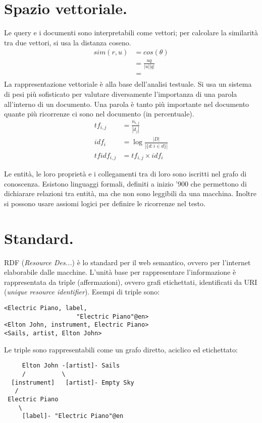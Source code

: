 \documentclass[11pt, twocolumn]{article}
\begin{document}
\section{Spazio vettoriale.}
Le query e i documenti sono interpretabili come vettori; per calcolare la similarità tra due vettori, si usa la distanza coseno.
\begin{align*}
  sim(r, u) &= cos(\theta) \\
            &= \frac{u q}{|u| |q|} \\
            &= \frac{}{}
  \end{align*}
La rappresentazione vettoriale è alla base dell'analisi testuale.
Si usa un sistema di pesi più sofisticato per valutare diversamente l'importanza di una parola all'interno di un documento.
Una parola è tanto più importante nel documento quante più ricorrenze ci sono nel documento (in percentuale).
\begin{align*}
  tf_{i, j} &= \frac{n_{i,j}}{|d_j|} \\
  idf_i &= \log{\frac{|D|}{|\{d : i \in d\}|}} \\
  tfidf_{i, j} &= tf_{i, j} \times idf_i
\end{align*}

Le entità, le loro proprietà e i collegamenti tra di loro sono iscritti nel grafo di conoscenza.
Esistono linguaggi formali, definiti a inizio '900 che permettono di dichiarare relazioni tra entità, ma che non sono leggibili da una macchina.
Inoltre si possono usare assiomi logici per definire le ricorrenze nel testo.


\section{Standard.}
RDF (\textit{Resource Des...}) è lo standard per il web semantico, ovvero per l'internet elaborabile dalle macchine.
L'unità base per rappresentare l'informazione è rappresentata da triple (affermazioni), ovvero grafi etichettati, identificati da URI (\textit{unique resource identifier}).
Esempi di triple sono:
\begin{verbatim}
<Electric Piano, label,
                    "Electric Piano"@en>
<Elton John, instrument, Electric Piano>
<Sails, artist, Elton John>
\end{verbatim}
Le triple sono rappresentabili come un grafo diretto, aciclico ed etichettato:
\begin{verbatim}
     Elton John -[artist]- Sails
     /          \
  [instrument]   [artist]- Empty Sky
   /
 Electric Piano 
    \
     [label]- "Electric Piano"@en
\end{verbatim}
\end{document}
